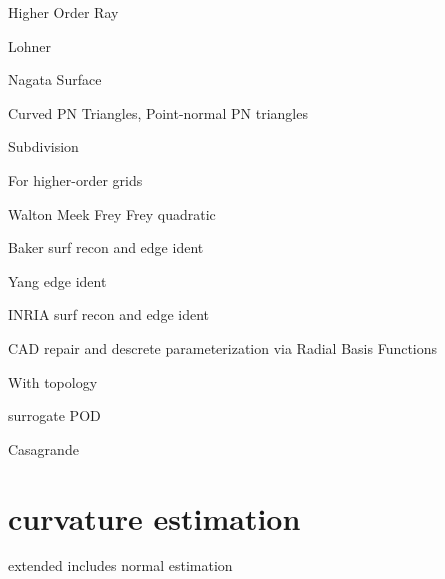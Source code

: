 \documentclass{article}
\begin{document}
Higher Order Ray\cite{ray-delany-einstein-jiao-robust-ho-surf-recon-remesh}

Lohner\cite{lohner-regridding-surface}
\cite{kim-takano-nakahashi-adjoint-adapt,kim-nakahashi-adjoint-adapt-viscous}

Nagata Surface \cite{nagata-surface-recon-interp-normal}

Curved PN Triangles,
Point-normal PN triangles\cite{vlachos-curved-pn-triangles}

Subdivision\cite{haimes-imr15-subdivision,wood-taylor-subdivision-opt}

For higher-order grids\cite{unstruct-3d-ho-grid-dg-surf-recon}
\cite{jiao-wang-resonstruct-ho-surf}

Walton Meek\cite{walton-meek-g1-tri-patch-recovery-bound-curve}
Frey\cite{frey-imr9-about-surface-remeshing}
Frey quadratic\cite{dapogny-dobrzynski-frey-3d-adapt-surf-recon}

Baker surf recon and edge ident\cite{baker-imr13}

Yang edge ident\cite{yang-zheng-wang-joint-line-detection-tri}

INRIA surf recon and edge ident\cite{borouchaki-surface-reconstruction}

CAD repair and descrete parameterization via Radial Basis Functions
\cite{cad-repair-discrete-param-rbf}

With topology\cite{lepage-habashi-cad-reconstruction}

surrogate POD\cite{bobrowski-surrogate-geom-pod-adj-opt}

Casagrande\cite{casagrande-phd-para-adapt-recon}
\cite{casagrande-para-adapt-geom-preserve-surf}

\section{curvature estimation}

extended includes normal estimation\cite{garimella-2003-curvature}



\end{document}
